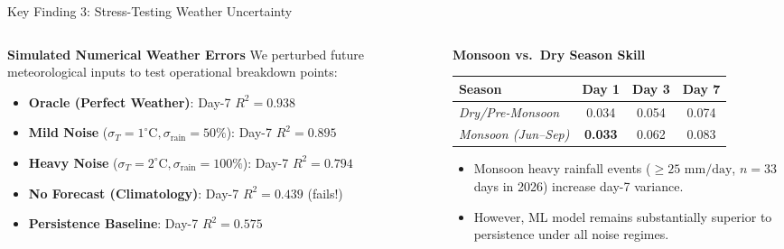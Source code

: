 \documentclass[aspectratio=169, 10pt]{beamer}
\begin{document}
\begin{frame}{Key Finding 3: Stress-Testing Weather Uncertainty}
    \begin{columns}
        \begin{column}{0.48\textwidth}
            \begin{block}{\textbf{Simulated Numerical Weather Errors}}
                \footnotesize
                We perturbed future meteorological inputs to test operational breakdown points:
                \begin{itemize}
                    \item \textbf{Oracle (Perfect Weather)}: Day-7 $R^2 = \mathbf{0.938}$
                    \item \textbf{Mild Noise} ($\sigma_T=1^\circ\text{C}, \sigma_{\text{rain}}=50\%$): Day-7 $R^2 = \mathbf{0.895}$
                    \item \textbf{Heavy Noise} ($\sigma_T=2^\circ\text{C}, \sigma_{\text{rain}}=100\%$): Day-7 $R^2 = \mathbf{0.794}$
                    \item \textbf{No Forecast (Climatology)}: Day-7 $R^2 = 0.439$ (fails!)
                    \item \textbf{Persistence Baseline}: Day-7 $R^2 = 0.575$
                \end{itemize}
            \end{block}
        \end{column}
        \begin{column}{0.48\textwidth}
            \begin{exampleblock}{\textbf{Monsoon vs.\ Dry Season Skill}}
                \footnotesize
                \centering
                \begin{tabular}{lccc}
                    \toprule
                    \textbf{Season} & \textbf{Day 1} & \textbf{Day 3} & \textbf{Day 7} \\
                    \midrule
                    \textit{Dry/Pre-Monsoon} & 0.034 & 0.054 & 0.074 \\
                    \textit{Monsoon (Jun--Sep)} & \textbf{0.033} & 0.062 & 0.083 \\
                    \bottomrule
                \end{tabular}
                \vspace{0.2cm}
                \flushleft
                \begin{itemize}
                    \item Monsoon heavy rainfall events ($\ge 25\text{ mm/day}$, $n=33$ days in 2026) increase day-7 variance.
                    \item However, ML model remains substantially superior to persistence under all noise regimes.
                \end{itemize}
            \end{exampleblock}
        \end{column}
    \end{columns}
\end{frame}
\end{document}
